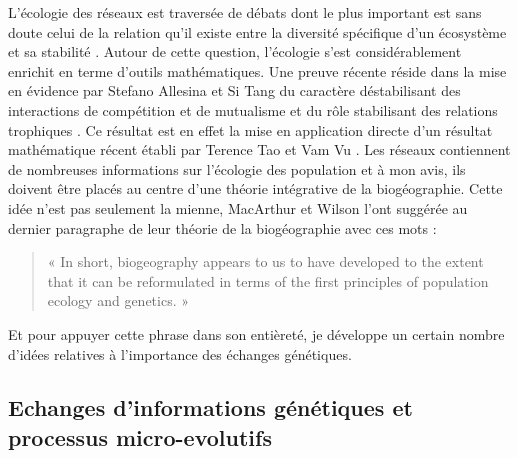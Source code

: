 L'écologie des réseaux est traversée de débats dont le plus important
est sans doute celui de la relation qu'il existe entre la diversité
spécifique d'un écosystème et sa stabilité \citep{May1973, McCann2000}.
Autour de cette question, l'écologie s'est considérablement enrichit en
terme d'outils mathématiques. Une preuve récente réside dans la mise en
évidence par Stefano Allesina et Si Tang du caractère déstabilisant des
interactions de compétition et de mutualisme et du rôle stabilisant des
relations trophiques \citep{Allesina2012a}. Ce résultat est en effet la
mise en application directe d'un résultat mathématique récent établi par
Terence Tao et Vam Vu \citep{Tao2010}. Les réseaux contiennent de
nombreuses informations sur l'écologie des population et à mon avis, ils
doivent être placés au centre d'une théorie intégrative de la
biogéographie. Cette idée n'est pas seulement la mienne, MacArthur et
Wilson l'ont suggérée au dernier paragraphe de leur théorie de la
biogéographie avec ces mots \citep{MacArthur1967} :

\begin{quote}
« In short, biogeography appears to us to have developed to the extent
that it can be reformulated in terms of the first principles of
population ecology and genetics. »
\end{quote}

Et pour appuyer cette phrase dans son entièreté, je développe un certain
nombre d'idées relatives à l'importance des échanges génétiques.

\subsection*{Echanges d'informations génétiques et processus
micro-evolutifs}\label{echanges-dinformations-guxe9nuxe9tiques-et-processus-micro-evolutifs}


